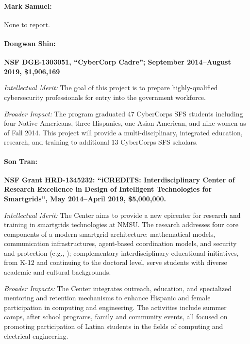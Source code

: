 \paragraph{Mark Samuel:} None to report.

\paragraph{Dongwan Shin:}\textbf{NSF DGE-1303051, ``CyberCorp Cadre''; September 2014--August 2019, \$1,906,169}

\noindent\textit{Intellectual Merit:} The goal of this project is to prepare highly-qualified cybersecurity professionals for entry into the government workforce. 

\noindent\textit{Broader Impact:} The program graduated 47 CyberCorps SFS students including four Native Americans, three Hispanics, one Asian American, and nine women as of Fall 2014. This project will provide a multi-disciplinary, integrated education, research, and training to additional 13 CyberCorps SFS scholars.

\paragraph{Son Tran:}
\textbf{NSF Grant HRD-1345232: ``iCREDITS: Interdisciplinary Center of Research Excellence in Design of Intelligent Technologies for Smartgrids'', May 2014--April 2019,  \$5,000,000.}

\noindent\textit{Intellectual Merit:} The Center aims to provide a new epicenter for research and training in smartgrids technologies at NMSU. The
	 research addresses four core components of a modern smartgrid architecture: mathematical models, communication infrastructures,   
	 agent-based coordination models, and security and protection (e.g., \cite{cp15,ToSP15,LeSP15b,LeSPY15,LeF0SP16,TiepSP19,ChowdhuryKS018,2016grid,SonPNS14}); complementary interdisciplinary educational initiatives, from K-12 and continuing to the doctoral level,  serve students with diverse academic and cultural backgrounds. 
	 
\noindent\textit{Broader Impacts:} The Center integrates outreach, education, and specialized mentoring and retention mechanisms to enhance Hispanic and female participation in computing and engineering. The activities include summer camps, after school programs, family and community events, all focused on promoting participation of Latina students in the fields of computing and electrical engineering.





